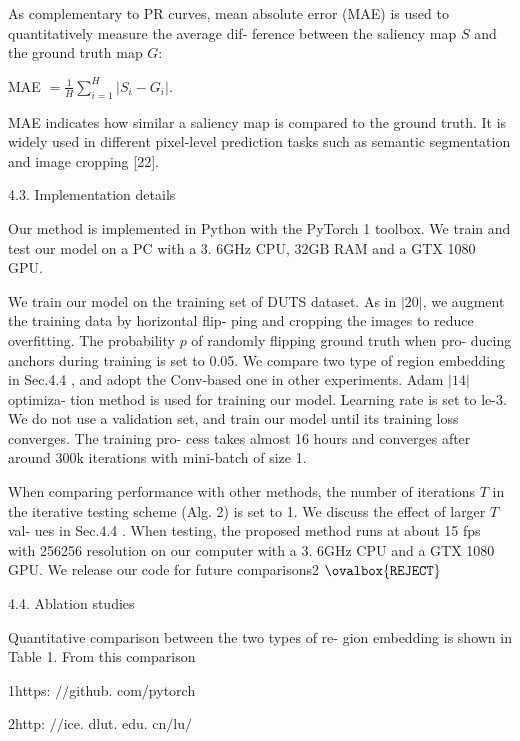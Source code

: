 \documentclass[a4paper,10pt]{article}
\begin{document}
As complementary to PR curves, mean absolute error (MAE) is used to quantitatively measure the average dif- ference between the saliency map $S$ and the ground truth map $G$:

MAE $=\displaystyle \frac{1}{H}\sum_{i=1}^{H}|S_{i}-G_{i}|.$

MAE indicates how similar a saliency map is compared to the ground truth. It is widely used in different pixel-level prediction tasks such as semantic segmentation and image cropping [22].

4.3. Implementation details

Our method is implemented in Python with the PyTorch 1 toolbox. We train and test our model on a PC with a 3. $6\mathrm{G}\mathrm{H}\mathrm{z}$ CPU, $32\mathrm{G}\mathrm{B}$ RAM and a GTX 1080 GPU.

We train our model on the training set of DUTS dataset. As in $|20|$, we augment the training data by horizontal flip- ping and cropping the images to reduce overfitting. The probability $p$ of randomly flipping ground truth when pro- ducing anchors during training is set to 0.05. We compare two type of region embedding in Sec.4.4 , and adopt the Conv-based one in other experiments. Adam $|14|$ optimiza- tion method is used for training our model. Learning rate is set to le-3. We do not use a validation set, and train our model until its training loss converges. The training pro- cess takes almost 16 hours and converges after around $300\mathrm{k}$ iterations with mini-batch of size 1.

When comparing performance with other methods, the number of iterations $T$ in the iterative testing scheme (Alg. 2) is set to 1. We discuss the effect of larger $T$ val- ues in Sec.4.4 . When testing, the proposed method runs at about 15 fps with 256256 resolution on our computer with a 3. $6\mathrm{G}\mathrm{H}\mathrm{z}$ CPU and a GTX 1080 GPU. We release our code for future comparisons2 $\ovalbox{\tt\small REJECT}$

4.4. Ablation studies

Quantitative comparison between the two types of re- gion embedding is shown in Table 1. From this comparison

1https: $//$github. com/pytorch

2http: $//\mathrm{i}\mathrm{c}\mathrm{e}$. dlut. edu. $\mathrm{c}\mathrm{n}/\mathrm{l}\mathrm{u}/$
\end{document}
